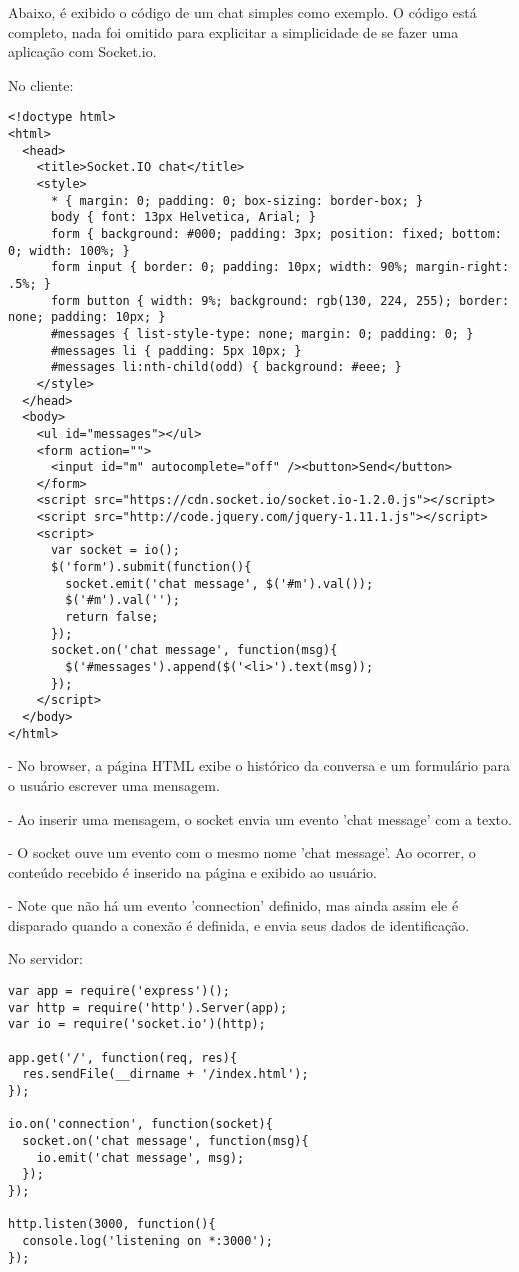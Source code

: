 \documentclass[a4paper,12pt]{article}
\begin{document}
Abaixo, é exibido o código de um chat simples como exemplo. O código está completo, nada foi omitido para explicitar a simplicidade de se fazer uma aplicação com Socket.io.


No cliente:
\begin{small}
\begin{verbatim}
<!doctype html>
<html>
  <head>
    <title>Socket.IO chat</title>
    <style>
      * { margin: 0; padding: 0; box-sizing: border-box; }
      body { font: 13px Helvetica, Arial; }
      form { background: #000; padding: 3px; position: fixed; bottom: 0; width: 100%; }
      form input { border: 0; padding: 10px; width: 90%; margin-right: .5%; }
      form button { width: 9%; background: rgb(130, 224, 255); border: none; padding: 10px; }
      #messages { list-style-type: none; margin: 0; padding: 0; }
      #messages li { padding: 5px 10px; }
      #messages li:nth-child(odd) { background: #eee; }
    </style>
  </head>
  <body>
    <ul id="messages"></ul>
    <form action="">
      <input id="m" autocomplete="off" /><button>Send</button>
    </form>
    <script src="https://cdn.socket.io/socket.io-1.2.0.js"></script>
    <script src="http://code.jquery.com/jquery-1.11.1.js"></script>
    <script>
      var socket = io();
      $('form').submit(function(){
        socket.emit('chat message', $('#m').val());
        $('#m').val('');
        return false;
      });
      socket.on('chat message', function(msg){
        $('#messages').append($('<li>').text(msg));
      });
    </script>
  </body>
</html>
\end{verbatim}
\end{small}

- No browser, a página HTML exibe o histórico da conversa e um formulário para o usuário escrever uma mensagem.

- Ao inserir uma mensagem, o socket envia um evento 'chat message' com a texto.

- O socket ouve um evento com o mesmo nome 'chat message'. Ao ocorrer, o conteúdo recebido é inserido na página e exibido ao usuário.

- Note que não há um evento 'connection' definido, mas ainda assim ele é disparado quando a conexão é definida, e envia seus dados de identificação.


No servidor:

\begin{small}
\begin{verbatim}
var app = require('express')();
var http = require('http').Server(app);
var io = require('socket.io')(http);

app.get('/', function(req, res){
  res.sendFile(__dirname + '/index.html');
});

io.on('connection', function(socket){
  socket.on('chat message', function(msg){
    io.emit('chat message', msg);
  });
});

http.listen(3000, function(){
  console.log('listening on *:3000');
});
\end{verbatim}
\end{small}
\end{document}

